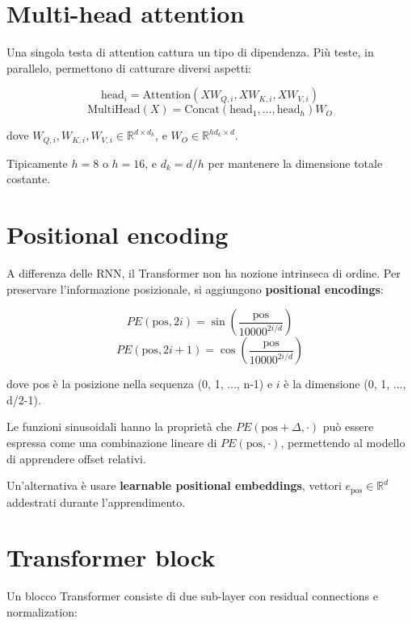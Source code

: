 \section{Multi-head attention}

Una singola testa di attention cattura un tipo di dipendenza. Più teste, in parallelo, permettono di catturare diversi aspetti:

\begin{definition}
\[
\text{head}_i = \text{Attention}(X W_{Q,i}, X W_{K,i}, X W_{V,i})
\]
\[
\text{MultiHead}(X) = \text{Concat}(\text{head}_1, \ldots, \text{head}_h) W_O
\]

dove $W_{Q,i}, W_{K,i}, W_{V,i} \in \mathbb{R}^{d \times d_k}$, e $W_O \in \mathbb{R}^{hd_k \times d}$.

Tipicamente $h = 8$ o $h = 16$, e $d_k = d / h$ per mantenere la dimensione totale costante.
\end{definition}

\section{Positional encoding}

A differenza delle RNN, il Transformer non ha nozione intrinseca di ordine. Per preservare l'informazione posizionale, si aggiungono \textbf{positional encodings}:

\begin{definition}
\[
PE(\text{pos}, 2i) = \sin\left(\frac{\text{pos}}{10000^{2i/d}}\right)
\]
\[
PE(\text{pos}, 2i+1) = \cos\left(\frac{\text{pos}}{10000^{2i/d}}\right)
\]

dove pos è la posizione nella sequenza (0, 1, ..., n-1) e $i$ è la dimensione (0, 1, ..., d/2-1).
\end{definition}

Le funzioni sinusoidali hanno la proprietà che $PE(\text{pos} + \Delta, \cdot)$ può essere espressa come una combinazione lineare di $PE(\text{pos}, \cdot)$, permettendo al modello di apprendere offset relativi.

Un'alternativa è usare \textbf{learnable positional embeddings}, vettori $e_{\text{pos}} \in \mathbb{R}^d$ addestrati durante l'apprendimento.

\section{Transformer block}

Un blocco Transformer consiste di due sub-layer con residual connections e normalization:

